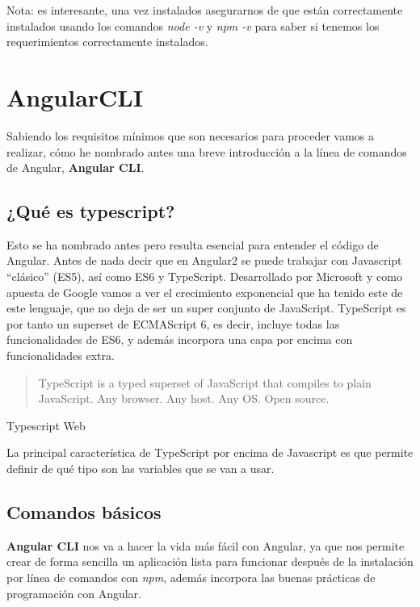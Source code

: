 Nota: es interesante, una vez instalados asegurarnos de que están correctamente instalados usando los comandos \emph{node -v} y \emph{npm -v} para saber si tenemos los requerimientos correctamente instalados.


\section{AngularCLI}\label{angularCLI}
Sabiendo los requisitos mínimos que son necesarios para proceder vamos a realizar, cómo he nombrado antes una breve introducción a la línea de comandos de Angular,  \textbf{Angular CLI}.

\subsection{¿Qué es typescript?}\label{typesript}
Esto se ha nombrado antes pero resulta esencial para entender el código de Angular. Antes de nada decir que en Angular2 se puede trabajar con Javascript “clásico” (ES5), así como ES6 y TypeScript. Desarrollado por Microsoft y como apuesta de Google vamos a ver el crecimiento exponencial que ha tenido este de este lenguaje, que no deja de ser un super conjunto de JavaScript. 
 TypeScript es por tanto un superset de ECMAScript 6, es decir, incluye todas las funcionalidades de ES6, y además incorpora una capa por encima con funcionalidades extra.

\begin{center}
    \begin{minipage}{0.9\linewidth}
        \vspace{5pt}%
        {\small
        \begin{quote}
            TypeScript is a typed superset of JavaScript that compiles to plain JavaScript. Any browser. Any host. Any OS. Open source.
            \end{quote}
        }
        \begin{flushright}
            Typescript Web \cite{typescript}
        \end{flushright}
        \vspace{5pt}%
    \end{minipage}
\end{center}

La principal característica de TypeScript por encima de Javascript es que permite definir de qué tipo son las variables que se van a usar.

\subsection{Comandos básicos}\label{cbasicos}
\textbf{Angular CLI} nos va a hacer la vida más fácil con Angular, ya que nos permite crear de forma sencilla un aplicación lista para funcionar después de la instalación por línea de comandos con \emph{npm}, además incorpora las buenas prácticas de programación con Angular. 

